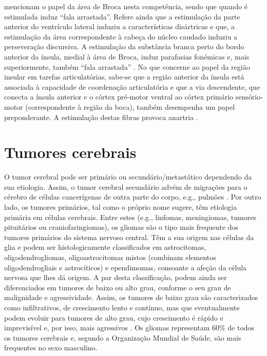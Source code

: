 \documentclass[output=paper,colorlinks,citecolor=brown,booklanguage=portuguese]{langscibook}
\begin{document}
\citet{Bello2007} mencionam o papel da área de Broca nesta competência, sendo que quando é estimulada induz “fala arrastada”. Refere ainda que a estimulação da parte anterior do ventrículo lateral induziu a características disártricas e que, a estimulação da área correspondente à cabeça do núcleo caudado induziu a perseveração discursiva. A estimulação da substância branca perto do bordo anterior da ínsula, medial à área de Broca, induz parafasias fonémicas e, mais superiormente, também “fala arrastada” \citep{Bello2007}. No que concerne ao papel da região insular em tarefas articulatórias, sabe-se que a região anterior da ínsula está associada à capacidade de coordenação articulatória \citep{Baldo2006} e que a via descendente, que conecta a ínsula anterior e o córtex pré-motor ventral ao córtex primário sensório-motor (correspondente à região da boca), também desempenha um papel preponderante. A estimulação destas fibras provoca anartria \citep{Bello2010, Coello2013, Duffau2006}.

\section{Tumores cerebrais}

O tumor cerebral pode ser primário ou secundário/metastático dependendo da sua etiologia. Assim, o tumor cerebral secundário advém de migrações para o cérebro de células cancerígenas de outra parte do corpo, e.g., pulmões \citep{DenBent2012}. Por outro lado, os tumores primários, tal como o próprio nome sugere, têm etiologia primária em células cerebrais. Entre estes (e.g., linfomas, meningiomas, tumores pituitários ou craniofaringiomas), os gliomas são o tipo mais frequente dos tumores primários do sistema nervoso central. Têm a sua origem nas células da glia e podem ser histologicamente classificados em astrocitomas, oligodendrogliomas, oligoastrocitomas mistos (combinam elementos oligodendrogliais e astrocíticos) e ependimomas, consoante a afeção da célula nervosa que lhes dá origem. A par desta classificação, podem ainda ser diferenciados em tumores de baixo ou alto grau, conforme o seu grau de malignidade e agressividade. Assim, os tumores de baixo grau são caracterizados como infiltrativos, de crescimento lento e contínuo, mas que eventualmente podem evoluir para tumores de alto grau, cujo crescimento é rápido e imprevisível e, por isso, mais agressivos \citep{Miotto2011}. Os gliomas representam 60\% de todos os tumores cerebrais e, segundo a Organização Mundial de Saúde, são mais frequentes no sexo masculino.
\end{document}
